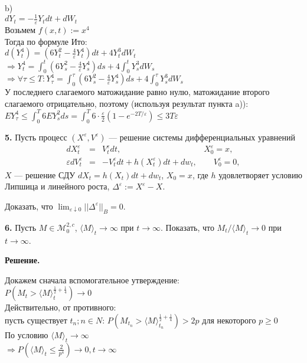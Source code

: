 \documentclass[12pt]{article}
\newcommand\cM{{\mathcal M}}
\newcommand\e{{\varepsilon}}
\newcommand\bean{\begin{eqnarray*}}
\newcommand\eean{\end{eqnarray*}}
\begin{document}
b)\\
$dY_t=-\frac{1}{\varepsilon }Y_tdt+ dW_t$\\
Возьмем $f(x,t):=x^4$\\
Тогда по формуле Ито:\\
$d(Y_t^4) = \left( 6Y_t^2 -\frac{4}{\varepsilon} Y_t^4 \right)dt + 4Y_t^3dW_t$\\

$\Rightarrow Y_t^4 = \int_{0}^{t} \left( 6Y_s^2 -\frac{4}{\varepsilon} Y_s^4 \right)ds + 4\int_{0}^{t} Y_s^3dW_s$\\

$\Rightarrow \forall \tau \leq T: Y_\tau^4 = \int_{0}^{\tau} \left( 6Y_s^2 -\frac{4}{\varepsilon} Y_s^4 \right)ds + 4\int_{0}^{\tau} Y_s^3dW_s$\\

У последнего слагаемого матожидание равно нулю, матожидание второго слагаемого отрицательно, поэтому (используя результат пункта a)):\\
$EY_\tau^4 \leq \int_{0}^{T} 6EY_s^2ds = \int_{0}^{T} 6 \cdot \frac{\varepsilon}{2} (1-e^{-2T/\varepsilon}) \leq 3T\varepsilon$


\bigskip
\noindent
{\bf 5.}  Пусть процесс $(X^\e,V^\e)$ --- решение системы дифференциальных уравнений
\bean
dX^\e_t&=&V^\e_t dt, \qquad  \qquad \qquad \qquad \qquad X^\e_0=x,\\
\e dV^\e_t&=&-V^\e_t dt +h(X_t^\e)dt +dw_t, \qquad V^\e_0=0, 
\eean
$X$ ---  решение СДУ $dX_t=h(X_t)dt +dw_t$, $X_0=x$, где $h$  удовлетворяет условию Липшица и линейного роста,  $\Delta^\e:=X^\e-X$.


Доказать, что $\lim_{\e\downarrow 0} ||\Delta^\e||_B=0$. 

\bigskip
\noindent
{\bf 6.} 
 Пусть   $M\in \cM^{2,c}_0$,   $\langle M\rangle_t\to \infty$        при  $t\to \infty$. 
Показать, что   $M_t/\langle M\rangle_t\to 0$ при $t\to \infty$.

\smallskip
{\bf  Решение.}  


Докажем сначала вспомогательное утверждение:\\
$P\left( M_t > \langle M\rangle_t^{\frac{1}{2} + \frac{1}{4}} \right) \to 0$\\
Действительно, от противного:\\
пусть существует $t_n; n \in N$: $P\left( M_{t_n} > \langle M\rangle_{t_n}^{\frac{1}{2} + \frac{1}{4}} \right) > 2p$ для некоторого $p \ge 0$\\
По условию $\langle M\rangle_t \to \infty$\\
$\Rightarrow P\left( \langle M\rangle_t \leq \frac{2}{p^4} \right) \to 0, t \to \infty$\\
\end{document}
